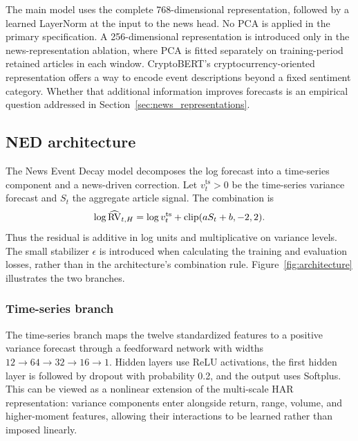 The main model uses the complete 768-dimensional representation, followed
by a learned LayerNorm at the input to the news head. No PCA is applied
in the primary specification. A 256-dimensional representation is
introduced only in the news-representation ablation, where PCA is fitted
separately on training-period retained articles in each window.
CryptoBERT's cryptocurrency-oriented representation offers a way to
encode event descriptions beyond a fixed sentiment category. Whether
that additional information improves forecasts is an empirical question
addressed in Section~\ref{sec:news_representations}.




\subsection{NED architecture}\label{sec:architecture}
The News Event Decay model decomposes the log forecast into a
time-series component and a news-driven correction. Let
$v_t^{\mathrm{ts}}>0$ be the time-series variance forecast and $S_t$ the
aggregate article signal. The combination is
\begin{equation}
 \log\widehat{\operatorname{RV}}_{t,H}=\log v_t^{\mathrm{ts}}+
    \operatorname{clip}(aS_t+b,-2,2).\label{eq:residual}
\end{equation}
Thus the residual is additive in log units and multiplicative on variance
levels. The small stabilizer $\epsilon$ is introduced when calculating
the training and evaluation losses, rather than in the architecture's
combination rule. Figure~\ref{fig:architecture} illustrates the two branches.

\subsubsection{Time-series branch}
The time-series branch maps the twelve standardized features to a
positive variance forecast through a feedforward network with widths
$12\to64\to32\to16\to1$. Hidden layers use ReLU activations, the first
hidden layer is followed by dropout with probability 0.2, and the output
uses Softplus. This can be viewed as a nonlinear extension of the
multi-scale HAR representation: variance components enter alongside
return, range, volume, and higher-moment features, allowing their
interactions to be learned rather than imposed linearly.

